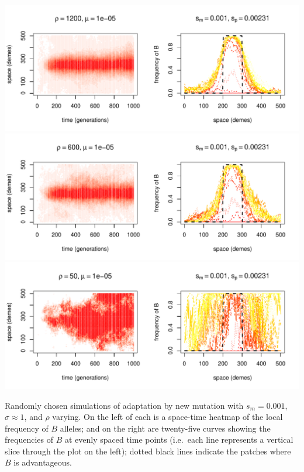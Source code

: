 \documentclass{article}
\begin{document}
\begin{sfigure}
  \begin{center}
    \includegraphics{example-mutation-sims/59611-r1-501-sb0_01-sm-0_001-N1200-pophistory-run}
    \includegraphics{example-mutation-sims/93713-r1-501-sb0_01-sm-0_001-N600-pophistory-run}
    \includegraphics{example-mutation-sims/29850-r1-501-sb0_01-sm-0_001-N50-pophistory-run}
  \end{center}
  \caption{
    Randomly chosen simulations of adaptation by new mutation
    with $s_m=0.001$, $\sigma\approx 1$, and $\rho$ varying.
    On the left of each is a space-time heatmap of the local frequency of $B$ alleles;
    and on the right are twenty-five curves showing the frequencies of $B$ at evenly spaced time points
    (i.e.\ each line represents a vertical slice through the plot on the left);
    dotted black lines indicate the patches where $B$ is advantageous.
  } \label{sfig:sims_3}
\end{sfigure}
\end{document}
